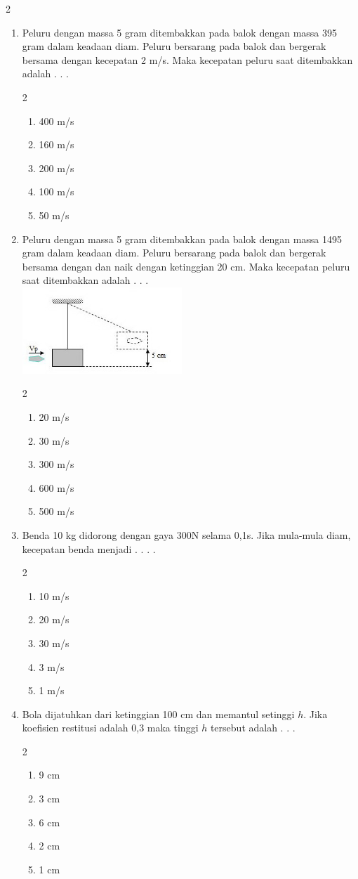 \documentclass[10pt,a4paper]{extarticle}
\newcommand{\pilgani}[1]{                            \vspace{-0.3cm}\begin{multicols}{2}
 \begin{enumerate}[label=\Alph*., itemsep=0pt,topsep=0pt,leftmargin=*,align=Center]#1                     \end{enumerate}
 \phantom{ini cuma sapi, wedus, dan ayam}
 \end{multicols}}
\begin{document}
\begin{multicols*}{2}
\begin{enumerate}
\item Peluru dengan massa 5 gram ditembakkan pada balok dengan massa 395 gram dalam keadaan diam. Peluru bersarang pada balok dan bergerak bersama dengan kecepatan 2 m/s. Maka kecepatan peluru saat ditembakkan adalah . . .
\pilgani{
   \item 400 m/s
   \item 160 m/s
   \item 200 m/s
   \item 100 m/s
   \item 50 m/s}
\vspace{1.6cm}

\item Peluru dengan massa 5 gram ditembakkan pada balok dengan massa 1495 gram dalam keadaan diam. Peluru bersarang pada balok dan bergerak bersama dengan dan naik dengan ketinggian 20 cm. Maka kecepatan peluru saat ditembakkan adalah . . .\\
\includegraphics[width=6cm]{pic/latul-mom1} 
\pilgani{
   \item 20 m/s
   \item 30 m/s
   \item 300 m/s
   \item 600 m/s
   \item 500 m/s
}
\vspace{2cm}



\item Benda 10 kg didorong dengan gaya 300N selama 0,1s. Jika mula-mula diam, kecepatan benda menjadi . . . .
\pilgani{
   \item 10 m/s
   \item 20 m/s
   \item 30 m/s
   \item 3 m/s
   \item 1 m/s }
\vspace{2cm}



\item Bola dijatuhkan dari ketinggian 100 cm dan memantul setinggi $h$. Jika koefisien restitusi adalah 0,3 maka tinggi $h$ tersebut adalah . . .
\pilgani{
   \item 9 cm
   \item 3 cm
   \item 6 cm
   \item 2 cm
   \item 1 cm }


\end{enumerate}
\end{multicols*}
\end{document}
